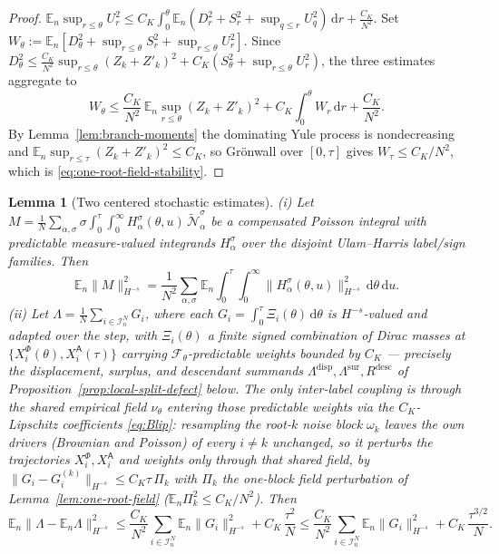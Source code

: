 \documentclass[a4paper,fleqn]{cas-sc}
\newtheorem{lemma}[theorem]{Lemma}
\theoremstyle{definition}
\theoremstyle{remark}
\begin{document}
\begin{proof}
$\mathbb E_n\sup_{r\le\theta}U_r^2\le C_K\int_0^\theta\mathbb E_n(D_r^2+S_r^2+\sup_{q\le r}U_q^2)\,\mathrm dr+\frac{C_K}{N^2}$. Set
$W_\theta:=\mathbb E_n[D_\theta^2+\sup_{r\le\theta}S_r^2+\sup_{r\le\theta}U_r^2]$. Since
$D_\theta^2\le\frac{C_K}{N^2}\sup_{r\le\theta}(Z_k+Z'_k)^2+C_K(S_\theta^2+\sup_{r\le\theta}U_r^2)$, the
three estimates aggregate to
\[
W_\theta\le\frac{C_K}{N^2}\,\mathbb E_n\sup_{r\le\theta}(Z_k+Z'_k)^2
+C_K\int_0^\theta W_r\,\mathrm dr+\frac{C_K}{N^2}.
\]
By Lemma~\ref{lem:branch-moments} the dominating Yule process is nondecreasing and
$\mathbb E_n\sup_{r\le\tau}(Z_k+Z'_k)^2\le C_K$, so Gr\"onwall over $[0,\tau]$ gives $W_\tau\le C_K/N^2$,
which is \eqref{eq:one-root-field-stability}.
\end{proof}

\begin{lemma}[Two centered stochastic estimates]\label{lem:martingale-field-tools}
\emph{(i)} Let $M=\frac1N\sum_{\alpha,\sigma}\sigma\int_0^\tau\!\int_0^\infty
H^\sigma_\alpha(\theta,u)\,\widetilde{\mathcal N}^\sigma_\alpha$ be a compensated Poisson
integral with predictable measure-valued integrands $H^\sigma_\alpha$ over the disjoint
Ulam--Harris label/sign families. Then
\begin{equation}\label{eq:iso}
\mathbb E_n\|M\|_{H^{-s}}^2
=\frac1{N^2}\sum_{\alpha,\sigma}\mathbb E_n\!\int_0^\tau\!\!\!\int_0^\infty\!\|H^\sigma_\alpha(\theta,u)\|_{H^{-s}}^2\,\mathrm d\theta\,\mathrm du.
\end{equation}
\emph{(ii)} Let $\Lambda=\frac1N\sum_{i\in\mathcal I^N_n}G_i$, where each
$G_i=\int_0^\tau\Xi_i(\theta)\,\mathrm d\theta$ is $H^{-s}$-valued and adapted over the step, with
$\Xi_i(\theta)$ a finite signed combination of Dirac masses at
$\{X^\Phi_i(\theta),X^{\mathsf A}_i(\tau)\}$ carrying $\mathcal F_\theta$-predictable weights bounded by
$C_K$ --- precisely the displacement, surplus, and descendant summands
$\Lambda^{\mathrm{disp}},\Lambda^{\mathrm{sur}},R^{\mathrm{desc}}$ of
Proposition~\ref{prop:local-split-defect} below. The only inter-label coupling is through the shared
empirical field $\nu_\theta$ entering those predictable weights via the $C_K$-Lipschitz coefficients
\eqref{eq:Blip}: resampling the root-$k$ noise block $\omega_k$ leaves the \emph{own drivers}
(Brownian and Poisson) of every $i\ne k$ unchanged, so it perturbs the trajectories
$X^\Phi_i,X^{\mathsf A}_i$ and weights only through that shared field, by
$\|G_i-G^{(k)}_i\|_{H^{-s}}\le C_K\tau\,\Pi_k$ with $\Pi_k$ the one-block field perturbation of
Lemma~\ref{lem:one-root-field} ($\mathbb E_n\Pi_k^2\le C_K/N^2$). Then
\begin{equation}\label{eq:field-avg}
\mathbb E_n\|\Lambda-\mathbb E_n\Lambda\|_{H^{-s}}^2
\le\frac{C_K}{N^2}\sum_{i\in\mathcal I^N_n}\mathbb E_n\|G_i\|_{H^{-s}}^2
+C_K\,\frac{\tau^2}{N}
\le\frac{C_K}{N^2}\sum_{i\in\mathcal I^N_n}\mathbb E_n\|G_i\|_{H^{-s}}^2
+C_K\,\frac{\tau^{3/2}}{N}.
\end{equation}
\end{lemma}
\end{document}
